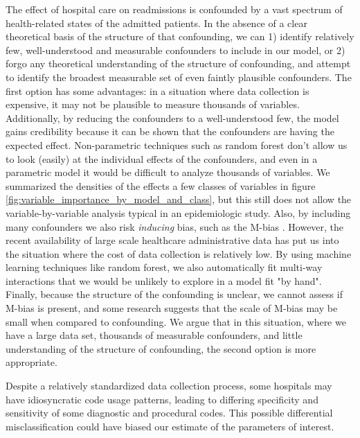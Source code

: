\documentclass[]{article}\usepackage[]{graphicx}\usepackage[]{color}
\begin{document}
The effect of hospital care on readmissions is confounded by a vast spectrum of health-related states of the admitted patients. In the absence of a clear theoretical basis of the structure of that confounding, we can 1) identify relatively few, well-understood and measurable confounders to include in our model, or 2) forgo any theoretical understanding of the structure of confounding, and attempt to identify the broadest measurable set of even faintly plausible confounders. The first option has some advantages: in a situation where data collection is expensive, it may not be plausible to measure thousands of variables. Additionally, by reducing the confounders to a well-understood few, the model gains credibility because it can be shown that the confounders are having the expected effect. Non-parametric techniques such as random forest don't allow us to look (easily) at the individual effects of the confounders, and even in a parametric model it would be difficult to analyze thousands of variables. We summarized the densities of the effects a few classes of variables in figure \ref{fig:variable_importance_by_model_and_class}, but this still does not allow the variable-by-variable analysis typical in an epidemiologic study. Also, by including many confounders we also risk \emph{inducing} bias, such as the M-bias \supercite{pearl_causal_1995,greenland_quantifying_2003}. However, the recent availability of large scale healthcare administrative data has put us into the situation where the cost of data collection is relatively low. By using machine learning techniques like random forest, we also automatically fit multi-way interactions that we would be unlikely to explore in a model fit "by hand". Finally, because the structure of the confounding is unclear, we cannot assess if M-bias is present, and some research suggests that the scale of M-bias may be small when compared to confounding.\supercite{liu_implications_2012} We argue that in this situation, where we have a large data set, thousands of measurable confounders, and little understanding of the structure of confounding, the second option is more appropriate.

Despite a relatively standardized data collection process, some hospitals may have idiosyncratic code usage patterns, leading to differing specificity and sensitivity of some diagnostic and procedural codes. This possible differential misclassification could have biased our estimate of the parameters of interest.
\end{document}
